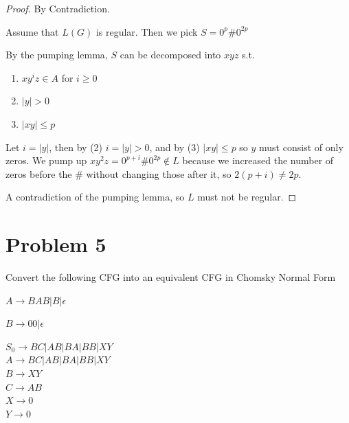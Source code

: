\documentclass[11pt]{article}
\begin{document}
\begin{proof} By Contradiction.

Assume that $L(G)$ is regular. Then we pick $S= 0^p \# 0^{2p}$

By the pumping lemma, $S$ can be decomposed into $xyz$ s.t.

\begin{enumerate}[(1)]
\item $xy^iz \in A$ for $i \geq 0$
\item $|y| > 0$
\item $|xy| \leq p$ 
\end{enumerate}

Let $i = |y|$, then by (2) $i = |y| > 0$, and by (3) $|xy| \leq p$ so $y$ must consist of only zeros. We pump up $xy^2z = 0^{p + i} \# 0^{2p} \notin L$ because we increased the number of zeros before the $\#$ without changing those after it, so $2(p+i) \neq 2p$.

A contradiction of the pumping lemma, so $L$ must not be regular.

\end{proof}

\newpage
\section*{Problem 5}

\noindent
Convert the following CFG into an equivalent CFG in Chomsky Normal Form

$A\rightarrow BAB|B|\epsilon$

$B\rightarrow 00|\epsilon$


$S_0 \rightarrow BC | AB | BA | BB | XY$\\
$A \rightarrow BC | AB | BA | BB | XY$\\
$B \rightarrow XY$\\
$C \rightarrow AB$\\
$X \rightarrow 0$\\
$Y \rightarrow 0$\\
\end{document}

